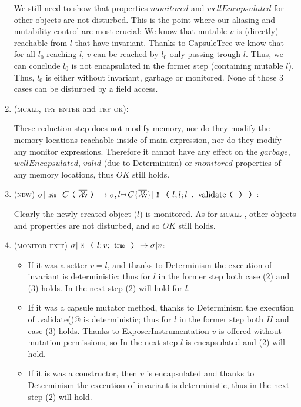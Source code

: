 \begin{enumerate}
We still need to show that properties $\mathit{monitored}$ and $\mathit{wellEncapsulated}$
 for other objects are
not disturbed. This is the point where our aliasing and mutability control are most crucial:
We know that mutable $v$ is (directly) reachable from
$l$ that have invariant.
Thanks to CapsuleTree we know that for all $l_0$ reaching $l$,
$v$ can be reached by $l_0$ only passing trough $l$.
Thus, we can conclude  $l_0$ is not encapsulated in the former step (containing mutable $l$).
Thus, $l_0$ is either without invariant, garbage or monitored.
None of those 3 cases can be disturbed by a field access.


\item (\textsc{mcall}, \textsc{try enter} and \textsc{try ok}):

These reduction step does not modify memory, nor do they modify the memory-locations reachable inside of main-expression, nor do they modify any monitor expressions. Therefore it cannot have any effect on the $garbage$, $wellEncapsulated$, $valid$ (due to Determinism) or $monitored$ properties of any memory locations, thus $\mathit{OK}$ still holds.

\item (\textsc{new}) $\sigma|\Kw{new}\ C\oR\vs\cR\rightarrow \sigma,l\mapsto C\{\vs\}| \Kw{M}\oR l;l;l\singleDot\text{validate}\oR\cR\cR$:


Clearly the newly created object ($l$) is monitored. As for \textsc{mcall} , other objects and properties are not disturbed, and so $\mathit{OK}$ still holds.


\item (\textsc{monitor exit}) $\sigma|\Kw{M}\oR l; v;\Kw{true}\cR\rightarrow \sigma|v$:

\begin{itemize}
\item
    If it was a setter $v = l$, and 
    thanks to Determinism the execution of invariant is deterministic;
    thus for $l$ in the former step both case (2) and (3) holds.
    In the next step (2) will hold for $l$.
\item
    If it was a capsule mutator method, thanks to Determinism the execution
 of \Q@.validate()@ is deterministic;
    thus for $l$ in the former step both $H$ and case (3) holds.
    Thanks to ExposerInstrumentation $v$ is offered without mutation permissions, so
    In the next step $l$ is encapsulated and (2) will hold.
\item
    If it is was a constructor, 
    then $v$ is encapsulated and thanks to Determinism
    the execution of invariant is deterministic, thus in the next step (2) will hold.
\end{itemize}



\end{enumerate}
